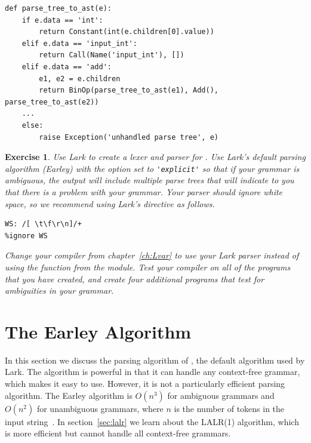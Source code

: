 \documentclass[7x10]{TimesAPriori_MIT}%
\newtheorem{exercise}[theorem]{Exercise}
\numberwithin{theorem}{chapter}
\numberwithin{definition}{chapter}
\numberwithin{equation}{chapter}
\begin{document}
{\begin{center}
\begin{minipage}{0.95\textwidth}
\begin{lstlisting}
def parse_tree_to_ast(e):
    if e.data == 'int':
        return Constant(int(e.children[0].value))
    elif e.data == 'input_int':
        return Call(Name('input_int'), [])
    elif e.data == 'add':
        e1, e2 = e.children
        return BinOp(parse_tree_to_ast(e1), Add(), parse_tree_to_ast(e2))
    ...
    else:
        raise Exception('unhandled parse tree', e)
\end{lstlisting}
\end{minipage}
\end{center}

\begin{exercise}
  \normalfont\normalsize
%
  Use Lark to create a lexer and parser for \LangVar{}.  Use Lark's
  default parsing algorithm (Earley) with the  option
  set to \lstinline{'explicit'} so that if your grammar is ambiguous, the
  output will include multiple parse trees that will indicate to you
  that there is a problem with your grammar. Your parser should ignore
  white space, so we recommend using Lark's  directive
  as follows.
\begin{lstlisting}
WS: /[ \t\f\r\n]/+
%ignore WS
\end{lstlisting}
Change your compiler from chapter~\ref{ch:Lvar} to use your
Lark parser instead of using the  function from
the  module. Test your compiler on all of the \LangVar{}
programs that you have created, and create four additional programs
that test for ambiguities in your grammar.
\end{exercise}


\section{The Earley Algorithm}
\label{sec:earley}

In this section we discuss the parsing algorithm of
\citet{Earley:1970ly}, the default algorithm used by Lark.  The
algorithm is powerful in that it can handle any context-free grammar,
which makes it easy to use. However, it is not a particularly
efficient parsing algorithm. The Earley algorithm is $O(n^3)$ for
ambiguous grammars and $O(n^2)$ for unambiguous grammars, where $n$ is
the number of tokens in the input
string~\citep{Hopcroft06:_automata}. In section~\ref{sec:lalr} we
learn about the LALR(1) algorithm, which is more efficient but cannot
handle all context-free grammars.

}
\end{document}
